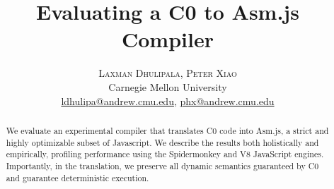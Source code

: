 \documentclass[twoside]{article}
\title{\vspace{-15mm}\fontsize{18pt}{10pt}\selectfont\textbf{Evaluating a C0 to Asm.js Compiler}} %
\author{
\large
\textsc{Laxman Dhulipala, Peter Xiao}\\[2mm] %
\normalsize Carnegie Mellon University \\ %
\normalsize \href{mailto:ldhulipa@andrew.cmu.edu}{ldhulipa@andrew.cmu.edu}, \href{mailto:phx@andrew.cmu.edu}{phx@andrew.cmu.edu} %
\vspace{-5mm}
}
\date{}
\begin{document}
\maketitle %

\thispagestyle{fancy} %


\begin{abstract}

\noindent We evaluate an experimental compiler that translates C0 code into Asm.js, a strict
and highly optimizable subset of Javascript. We describe the results both holistically and empirically,
profiling performance using the Spidermonkey and V8 JavaScript engines. Importantly, in the
translation, we preserve all dynamic semantics guaranteed by C0 and guarantee deterministic execution.

\end{abstract}

\end{document}
